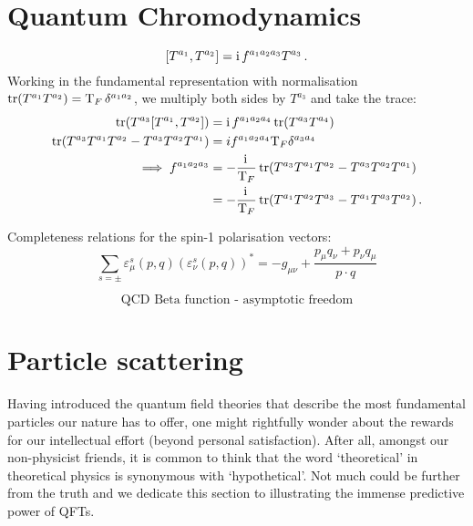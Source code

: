 \documentclass[main.tex]{subfiles}
\begin{document}
\section{Quantum Chromodynamics} \label{sec:QCD}
\begin{equation} \label{eq:liealgebra}
    [T^{a_1}, T^{a_2}] = \mathrm{i}\, f^{a_1a_2a_3} T^{a_3} \,.
\end{equation}
Working in the fundamental representation with normalisation $\operatorname{\rm tr}(T^{a_1} T^{a_2}) = \mathrm{T}_F \, \delta^{a_1a_2}$, we multiply both sides by $T^{a_3}$ and take the trace:
\begin{align} \label{eq:f(abc)}
    \operatorname{\rm tr}(T^{a_3}[T^{a_1}, T^{a_2}]) &= \mathrm{i}\, f^{a_1a_2a_4} \operatorname{\rm tr}(T^{a_3} T^{a_4}) \nonumber \\
    \operatorname{\rm tr}(T^{a_3} T^{a_1} T^{a_2} - T^{a_3} T^{a_2} T^{a_1}) &= if^{a_1a_2a_4} \mathrm{T}_F \delta^{a_3a_4} \nonumber \\ 
    \implies f^{a_1a_2a_3} &= -\frac{\mathrm{i}\,}{\mathrm{T}_F} \operatorname{\rm tr}(T^{a_3} T^{a_1} T^{a_2} - T^{a_3} T^{a_2} T^{a_1}) \nonumber \\
    &= -\frac{\mathrm{i}\,}{\mathrm{T}_F} \operatorname{\rm tr}(T^{a_1} T^{a_2} T^{a_3} - T^{a_1}T^{a_3} T^{a_2}) \,.
\end{align}

Completeness relations for the spin-1 polarisation vectors:
\begin{equation} \label{eq:completeness:bosons}
    \sum_{s=\pm} \varepsilon_\mu^s(p, q) (\varepsilon_\nu^s(p, q))^{\ast} = -g_{\mu\nu} + \frac{p_\mu q_\nu + p_\nu q_\mu}{p \cdot q}
\end{equation}

\begin{equation} \label{eq:QCDbetafunction2}
    \text{QCD Beta function - asymptotic freedom}
\end{equation}

\section{Particle scattering} \label{sec:particlescattering}
Having introduced the quantum field theories that describe the most fundamental particles our nature has to offer, one might rightfully wonder about the rewards for our intellectual effort (beyond personal satisfaction). After all, amongst our non-physicist friends, it is common to think that the word `theoretical' in theoretical physics is synonymous with `hypothetical'. Not much could be further from the truth and we dedicate this section to illustrating the immense predictive power of QFTs.
\end{document}
